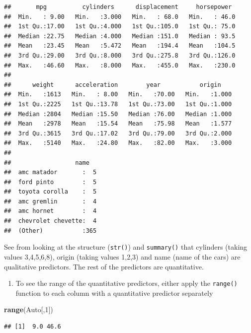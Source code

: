 \documentclass[]{article}
\newenvironment{Shaded}{\begin{snugshade}}{\end{snugshade}}
\newcommand{\KeywordTok}[1]{\textcolor[rgb]{0.13,0.29,0.53}{\textbf{#1}}}
\newcommand{\DecValTok}[1]{\textcolor[rgb]{0.00,0.00,0.81}{#1}}
\newcommand{\NormalTok}[1]{#1}
\providecommand{\tightlist}{%
  \setlength{\itemsep}{0pt}\setlength{\parskip}{0pt}}
\begin{document}
\begin{verbatim}
##       mpg          cylinders      displacement     horsepower   
##  Min.   : 9.00   Min.   :3.000   Min.   : 68.0   Min.   : 46.0  
##  1st Qu.:17.00   1st Qu.:4.000   1st Qu.:105.0   1st Qu.: 75.0  
##  Median :22.75   Median :4.000   Median :151.0   Median : 93.5  
##  Mean   :23.45   Mean   :5.472   Mean   :194.4   Mean   :104.5  
##  3rd Qu.:29.00   3rd Qu.:8.000   3rd Qu.:275.8   3rd Qu.:126.0  
##  Max.   :46.60   Max.   :8.000   Max.   :455.0   Max.   :230.0  
##                                                                 
##      weight      acceleration        year           origin     
##  Min.   :1613   Min.   : 8.00   Min.   :70.00   Min.   :1.000  
##  1st Qu.:2225   1st Qu.:13.78   1st Qu.:73.00   1st Qu.:1.000  
##  Median :2804   Median :15.50   Median :76.00   Median :1.000  
##  Mean   :2978   Mean   :15.54   Mean   :75.98   Mean   :1.577  
##  3rd Qu.:3615   3rd Qu.:17.02   3rd Qu.:79.00   3rd Qu.:2.000  
##  Max.   :5140   Max.   :24.80   Max.   :82.00   Max.   :3.000  
##                                                                
##                  name    
##  amc matador       :  5  
##  ford pinto        :  5  
##  toyota corolla    :  5  
##  amc gremlin       :  4  
##  amc hornet        :  4  
##  chevrolet chevette:  4  
##  (Other)           :365
\end{verbatim}

See from looking at the structure (\texttt{str()}) and
\texttt{summary()} that cylinders (taking values 3,4,5,6,8), origin
(taking values 1,2,3) and name (name of the cars) are qualitative
predictors. The rest of the predictors are quantitative.

\begin{enumerate}
\def\labelenumi{\alph{enumi})}
\setcounter{enumi}{1}
\tightlist
\item
  To see the range of the quantitative predictors, either apply the
  \texttt{range()} function to each column with a quantitative predictor
  separately
\end{enumerate}

\begin{Shaded}
\begin{Highlighting}[]
\KeywordTok{range}\NormalTok{(Auto[,}\DecValTok{1}\NormalTok{])}
\end{Highlighting}
\end{Shaded}

\begin{verbatim}
## [1]  9.0 46.6
\end{verbatim}
\end{document}
